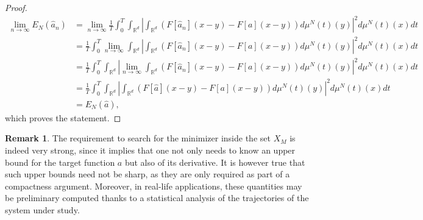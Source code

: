 \documentclass[A4paper,11pt]{article}
\theoremstyle{definition}
\newtheorem{remark}{Remark}
\newcommand{\R}{\mathbb{R}}
\begin{document}
\begin{proof}
\begin{align*}
\lim_{n \rightarrow \infty}E_N(\widehat a_n) &= \lim_{n \rightarrow \infty}\frac{1}{T}\int_0^T\int_{\R^d} \left| \int_{\R^d}
			\left(F[\widehat a_n](x-y)-F[a](x-y)\right)d\mu^N(t)(y)\right|^2d\mu^N(t)(x) dt\\
			&= \frac{1}{T}\int_0^T\lim_{n \rightarrow \infty}\int_{\R^d} \left| \int_{\R^d}
			\left(F[\widehat a_n](x-y)-F[a](x-y)\right)d\mu^N(t)(y)\right|^2 d\mu^N(t)(x) dt\\
			&= \frac{1}{T}\int_0^T\int_{\R^d} \left| \lim_{n \rightarrow \infty}\int_{\R^d}
			\left(F[\widehat a_n](x-y)-F[a](x-y)\right)d\mu^N(t)(y)\right|^2 d\mu^N(t)(x) dt\\
			&= \frac{1}{T}\int_0^T\int_{\R^d} \left| \int_{\R^d}
			\left(F[\widehat a](x-y)-F[a](x-y)\right)d\mu^N(t)(y)\right|^2 d\mu^N(t)(x) dt\\
&= E_N(\widehat a),
\end{align*}
which proves the statement.

\end{proof}

\begin{remark}
The requirement to search for the minimizer inside the set $X_M$ is indeed very strong, since it implies that one not only needs to know an upper bound for the target function $a$ but also of its derivative. It is however true that such upper bounds need not be sharp, as they are only required as part of a compactness argument. Moreover, in real-life applications, these quantities may be preliminary computed thanks to a statistical analysis of the trajectories of the system under study.
\end{remark}
\end{document}
